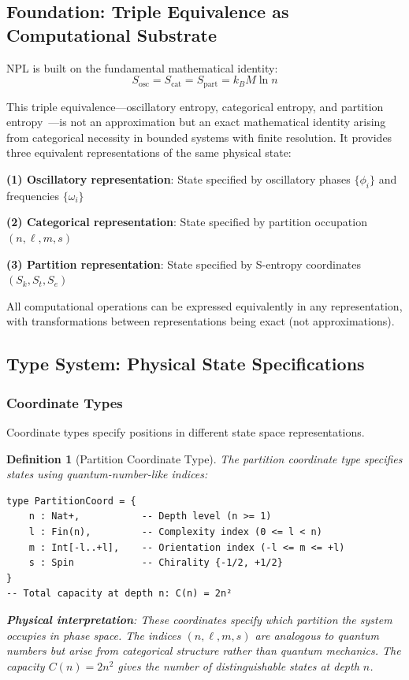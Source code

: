 \documentclass[aps,prd,twocolumn,superscriptaddress,floatfix,nofootinbib]{revtex4-2}
\newtheorem{definition}[theorem]{Definition}
\theoremstyle{remark}
\begin{document}
\subsection{Foundation: Triple Equivalence as Computational Substrate}

NPL is built on the fundamental mathematical identity:
\begin{equation}
\boxed{S_{\text{osc}} = S_{\text{cat}} = S_{\text{part}} = k_B M \ln n}
\end{equation}

This triple equivalence—oscillatory entropy, categorical entropy, and partition entropy~\cite{shannon1948mathematical,jaynes2003probability}—is not an approximation but an exact mathematical identity arising from categorical necessity in bounded systems with finite resolution. It provides three equivalent representations of the same physical state:

\textbf{(1) Oscillatory representation}: State specified by oscillatory phases $\{\phi_i\}$ and frequencies $\{\omega_i\}$

\textbf{(2) Categorical representation}: State specified by partition occupation $(n, \ell, m, s)$

\textbf{(3) Partition representation}: State specified by S-entropy coordinates $(S_k, S_t, S_e)$

All computational operations can be expressed equivalently in any representation, with transformations between representations being exact (not approximations).

\subsection{Type System: Physical State Specifications}

\subsubsection{Coordinate Types}

Coordinate types specify positions in different state space representations.

\begin{definition}[Partition Coordinate Type]
\label{def:partition_coord_type}
The partition coordinate type specifies states using quantum-number-like indices:
\begin{verbatim}
type PartitionCoord = {
    n : Nat+,           -- Depth level (n >= 1)
    l : Fin(n),         -- Complexity index (0 <= l < n)
    m : Int[-l..+l],    -- Orientation index (-l <= m <= +l)
    s : Spin            -- Chirality {-1/2, +1/2}
}
-- Total capacity at depth n: C(n) = 2n²
\end{verbatim}

\textbf{Physical interpretation}: These coordinates specify which partition the system occupies in phase space. The indices $(n, \ell, m, s)$ are analogous to quantum numbers but arise from categorical structure rather than quantum mechanics. The capacity $C(n) = 2n^2$ gives the number of distinguishable states at depth $n$.
\end{definition}
\end{document}
